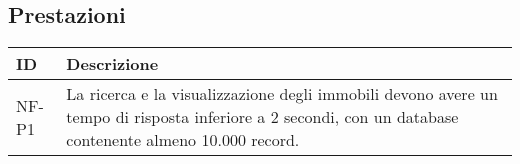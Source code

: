 \subsection*{Prestazioni}

\begin{table}[H]
    \centering
    \renewcommand{\arraystretch}{1.3} %
    \begin{tabular}{|p{3cm}|p{10cm}|} 
        \hline
        \textbf{ID} & \textbf{Descrizione} \\  
        \hline
        NF-P1 & La ricerca e la visualizzazione degli immobili devono avere un tempo di risposta inferiore
        a 2 secondi, con un database contenente almeno 10.000 record. \\ 
        \hline
    \end{tabular}
\end{table}
